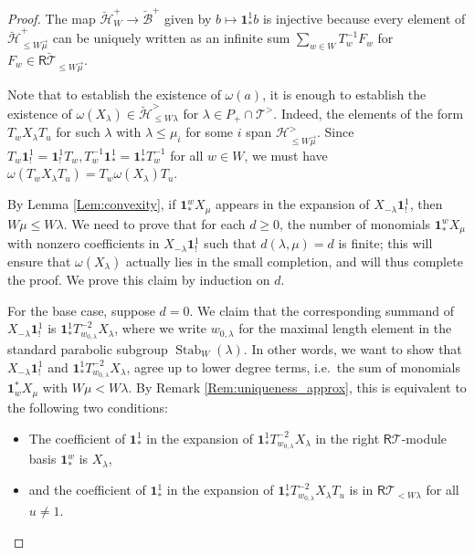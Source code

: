 \documentclass{amsart}
\newcommand{\Hecke}{\mathcal{H}}
\newcommand{\Ring}{\mathsf{R}}
\newcommand{\bone}{\mathbf{1}}
\newcommand{\B}{\mathcal{B}}
\theoremstyle{definition}
\numberwithin{equation}{section}
\begin{document}
\begin{proof}
The map $\breve{\Hecke}_W^+\rightarrow \breve{\B}^+$ given by $b\mapsto \bone_*^1 b$ is injective because every element of $\breve{\Hecke}^+_{\leqslant W\vec{\mu}}$ can be uniquely written as an infinite sum $\sum_{w\in W}T^{-1}_w F_w$ for $F_w\in \Ring\breve{\mathcal{T}}_{\leqslant W\vec{\mu}}$.

Note that to establish the existence of $\omega(a)$, it is enough to establish the existence of $\omega(X_\lambda)\in \breve{\Hecke}_{\leqslant W\lambda}^>$
for $\lambda\in P_+\cap \mathcal{T}^>$.
Indeed, the elements of the form $T_wX_\lambda T_u$ for such $\lambda$ with $\lambda\leqslant \mu_i$ for some $i$ span $\Hecke^>_{\leqslant W\vec{\mu}}$. Since $T_w\bone_!^1=\bone_!^1 T_w, T^{-1}_w\bone_*^1=\bone_*^1T^{-1}_w$ for all $w\in W$, we must have $\omega(T_wX_\lambda T_u)=T_w\omega(X_\lambda)T_u$.

By  Lemma \ref{Lem:convexity}, if $\bone_*^wX_\mu$ appears in the expansion of $X_{-\lambda} \bone_!^1$, then $W\mu\leqslant W\lambda$. We need to prove that for each $d\geqslant 0$, the number of monomials $\bone_*^w X_\mu$ with nonzero coefficients in $X_{-\lambda}\bone^1_!$ such that $d(\lambda,\mu)=d$ is finite; this will ensure that $\omega(X_{\lambda})$ actually lies in the small completion, and will thus complete the proof. We prove this claim by induction on $d$.

For the base case, suppose $d=0$. We claim that the corresponding summand of $X_{-\lambda}\bone_!^1$ is $\bone_*^1 T_{w_{0,\lambda}}^{-2} X_{\lambda}$, where we write $w_{0,\lambda}$ for the maximal length element in the standard parabolic subgroup $\operatorname{Stab}_W(\lambda)$. In other words, we want to show that $X_{-\lambda}\bone_!^1$ and $\bone_*^1 T_{w_{0,\lambda}}^{-2} X_{\lambda}$, agree up to lower degree terms, i.e.\ the sum of monomials $\bone^*_wX_{\mu}$ with $W\mu<W\lambda$. By  Remark \ref{Rem:uniqueness_approx}, this is equivalent to the following two conditions:
\begin{itemize}
\item[(1!)] The coefficient of $\bone^1_*$ in the expansion of  $\bone_*^1 T_{w_{0,\lambda}}^{-2} X_{\lambda}$ in the right $\Ring \mathcal{T}$-module basis $\bone^w_*$ is $X_{\lambda}$,
\item[(2!)] and the coefficient of $\bone^1_*$ in the expansion of $\bone_*^1 T_{w_{0,\lambda}}^{-2} X_{\lambda}T_u$ is in $\Ring\mathcal{T}_{<W\lambda}$ for all $u\neq 1$.
\end{itemize}


\end{proof}
\end{document}
